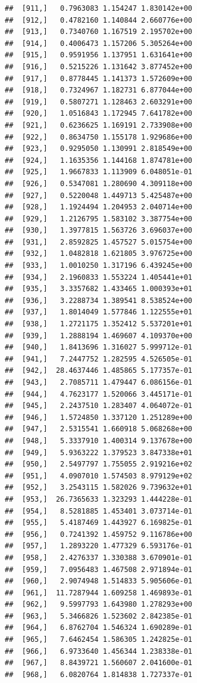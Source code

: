 \documentclass[article]{jss}\usepackage[]{graphicx}\usepackage[]{xcolor}
\makeatletter
\newenvironment{kframe}{%
 \def\at@end@of@kframe{}%
 \ifinner\ifhmode%
  \def\at@end@of@kframe{\end{minipage}}%
  \begin{minipage}{\columnwidth}%
 \fi\fi%
 \def\FrameCommand##1{\hskip\@totalleftmargin \hskip-\fboxsep
 \colorbox{shadecolor}{##1}\hskip-\fboxsep
     \hskip-\linewidth \hskip-\@totalleftmargin \hskip\columnwidth}%
 \MakeFramed {\advance\hsize-\width
   \@totalleftmargin\z@ \linewidth\hsize
   \@setminipage}}%
 {\par\unskip\endMakeFramed%
 \at@end@of@kframe}
\newenvironment{knitrout}{}{} %
\makeatother
\begin{document}
\begin{knitrout}
\begin{kframe}
\begin{verbatim}
##  [911,]   0.7963083 1.154247 1.830142e+00
##  [912,]   0.4782160 1.140844 2.660776e+00
##  [913,]   0.7340760 1.167519 2.195702e+00
##  [914,]   0.4006473 1.157206 5.305264e+00
##  [915,]   0.9591956 1.137951 1.631641e+00
##  [916,]   0.5215226 1.131642 3.877452e+00
##  [917,]   0.8778445 1.141373 1.572609e+00
##  [918,]   0.7324967 1.182731 6.877044e+00
##  [919,]   0.5807271 1.128463 2.603291e+00
##  [920,]   1.0516843 1.172945 7.641782e+00
##  [921,]   0.6236625 1.169191 2.733908e+00
##  [922,]   0.8634750 1.155178 1.929686e+00
##  [923,]   0.9295050 1.130991 2.818549e+00
##  [924,]   1.1635356 1.144168 1.874781e+00
##  [925,]   1.9667833 1.113909 6.048051e-01
##  [926,]   0.5347081 1.280690 4.309118e+00
##  [927,]   0.5220048 1.449713 5.425487e+00
##  [928,]   1.1924494 1.204953 2.040714e+00
##  [929,]   1.2126795 1.583102 3.387754e+00
##  [930,]   1.3977815 1.563726 3.696037e+00
##  [931,]   2.8592825 1.457527 5.015754e+00
##  [932,]   1.0482818 1.621805 3.976725e+00
##  [933,]   1.0010250 1.317196 6.439245e+00
##  [934,]   2.1960833 1.553224 1.405441e+01
##  [935,]   3.3357682 1.433465 1.000393e+01
##  [936,]   3.2288734 1.389541 8.538524e+00
##  [937,]   1.8014049 1.577846 1.122555e+01
##  [938,]   1.2721175 1.352412 5.537201e+01
##  [939,]   1.2888194 1.469607 4.109370e+00
##  [940,]   1.8413696 1.316027 5.999712e-01
##  [941,]   7.2447752 1.282595 4.526505e-01
##  [942,]  28.4637446 1.485865 5.177357e-01
##  [943,]   2.7085711 1.479447 6.086156e-01
##  [944,]   4.7623177 1.520066 3.445171e-01
##  [945,]   2.2437510 1.283407 4.064072e-01
##  [946,]   1.5724850 1.337120 1.251289e+00
##  [947,]   2.5315541 1.660918 5.068268e+00
##  [948,]   5.3337910 1.400314 9.137678e+00
##  [949,]   5.9363222 1.379523 3.847338e+01
##  [950,]   2.5497797 1.755055 2.919216e+02
##  [951,]   4.0907010 1.574503 8.979129e+02
##  [952,]   3.2543115 1.582026 9.739632e+01
##  [953,]  26.7365633 1.323293 1.444228e-01
##  [954,]   8.5281885 1.453401 3.073714e-01
##  [955,]   5.4187469 1.443927 6.169825e-01
##  [956,]   0.7241392 1.459752 9.116786e+00
##  [957,]   1.2893220 1.477329 6.593176e-01
##  [958,]   2.4276337 1.330388 3.670901e-01
##  [959,]   7.0956483 1.467508 2.971894e-01
##  [960,]   2.9074948 1.514833 5.905606e-01
##  [961,]  11.7287944 1.609258 1.469893e-01
##  [962,]   9.5997793 1.643980 1.278293e+00
##  [963,]   5.3466826 1.523602 2.842385e-01
##  [964,]   6.8762704 1.546324 1.690289e-01
##  [965,]   7.6462454 1.586305 1.242825e-01
##  [966,]   6.9733640 1.456344 1.238338e-01
##  [967,]   8.8439721 1.560607 2.041600e-01
##  [968,]   6.0820764 1.814838 1.727337e-01

\end{verbatim}
\end{kframe}
\end{knitrout}
\end{document}
